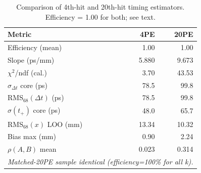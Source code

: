 \begin{table}[htbp]
\centering
\small
\caption{Comparison of 4th-hit and 20th-hit timing estimators. Efficiency = 1.00 for both; see text.}
\label{tab:threshold_comparison}
\begin{tabular}{lrr}
\toprule
\textbf{Metric} & \textbf{4PE} & \textbf{20PE} \\
\midrule
Efficiency (mean) & 1.00 & 1.00 \\
Slope (ps/mm) & 5.880 & 9.673 \\
$\chi^2$/ndf (cal.) & 3.70 & 43.53 \\
$\sigma_{\Delta t}$ core (ps) & 78.5 & 99.8 \\
RMS$_{68}(\Delta t)$ (ps) & 78.5 & 99.8 \\
$\sigma(t_+)$ core (ps) & 48.0 & 65.7 \\
RMS$_{68}(x)$ LOO (mm) & 13.34 & 10.32 \\
Bias max (mm) & 0.90 & 2.24 \\
$\rho(A,B)$ mean & 0.023 & 0.314 \\
\bottomrule
\multicolumn{3}{l}{\small \textit{Matched-20PE sample identical (efficiency=100\% for all k).}}
\end{tabular}
\end{table}

